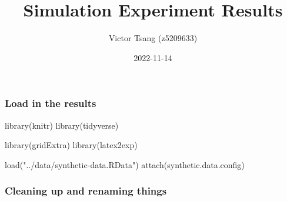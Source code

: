 \documentclass[
]{article}
\title{Simulation Experiment Results}
\author{Victor Tsang (z5209633)}
\date{2022-11-14}
\newenvironment{Shaded}{\begin{snugshade}}{\end{snugshade}}
\newcommand{\FunctionTok}[1]{\textcolor[rgb]{0.00,0.00,0.00}{#1}}
\newcommand{\NormalTok}[1]{#1}
\newcommand{\StringTok}[1]{\textcolor[rgb]{0.31,0.60,0.02}{#1}}
\begin{document}
\maketitle

\hypertarget{load-in-the-results}{%
\subsubsection{Load in the results}\label{load-in-the-results}}

\begin{Shaded}
\begin{Highlighting}[]
\FunctionTok{library}\NormalTok{(knitr)}
\FunctionTok{library}\NormalTok{(tidyverse)}

\FunctionTok{library}\NormalTok{(gridExtra)}
\FunctionTok{library}\NormalTok{(latex2exp)}

\FunctionTok{load}\NormalTok{(}\StringTok{"../data/synthetic{-}data.RData"}\NormalTok{)}
\FunctionTok{attach}\NormalTok{(synthetic.data.config)}
\end{Highlighting}
\end{Shaded}

\hypertarget{cleaning-up-and-renaming-things}{%
\subsubsection{Cleaning up and renaming
things}\label{cleaning-up-and-renaming-things}}
\end{document}
